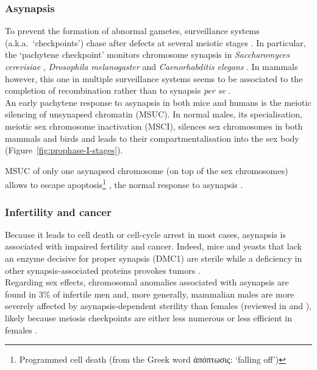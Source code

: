 \subsubsection{Asynapsis}
To prevent the formation of abnormal gametes, surveillance systems (a.k.a.\ ‘checkpoints’) chase after defects at several meiotic stages \citep[reviewed in][]{handel2010genetics}.
In particular, the ‘pachytene checkpoint’ \citep{roeder2000pachytene} monitors chromosome synapsis in \textit{Saccharomyces cerevisiae} \citep{wu2006two}, \textit{Drosophila melanogaster} \citep{ghabrial1999activation,abdu2002activation} and \textit{Caenorhabditis elegans} \citep{bhalla2005conserved}.
In mammals however, this one in multiple surveillance systems \citep{barchi2005surveillance} seems to be associated to the completion of recombination rather than to synapsis \textit{per se} \citep{li2007mouse}.\\

An early pachytene response to asynapsis in both mice \citep{baarends2005silencing,turner2005silencing} and humans \citep{ferguson2008silencing,sciurano2007asynaptic} is the meiotic silencing of unsynapsed chromatin (MSUC). 
In normal males, its specialisation, meiotic sex chromosome inactivation (MSCI), silences sex chromosomes in both mammals and birds \citep{schoenmakers2009female} and leads to their compartmentalisation into the sex body (Figure~\ref{fig:prophase-I-stages}).

MSUC of only one asynapsed chromosome (on top of the sex chromosomes) allows to escape apoptosis\footnote{Programmed cell death (from the Greek word \textgreek{ἀπόπτωσις}: ‘falling off’)} \citep{mahadevaiah2008extensive,jaramillo-lambert2010single}, the normal response to asynapsis \citep{hochwagen2006checking}.


\subsubsection{Infertility and cancer}
Because it leads to cell death or cell-cycle arrest in most cases, asynapsis is associated with impaired fertility and cancer.
Indeed, mice and yeasts that lack an enzyme decisive for proper synapsis (DMC1) are sterile \citep{bannister2007dominant} while a deficiency in other synapsis-associated proteins provokes tumors \citep{moynahan2002cancer, jasin2002homologous}.\\

Regarding sex effects, chromosomal anomalies associated with asynapsis are found in 3\% of infertile men \citep[cited in \citealp{burgoyne2009consequences}]{vincent2002cytogenetic} and, more generally, mammalian males are more severely affected by asynapsis-dependent sterility than females (reviewed in \citealp{burgoyne2009consequences} and \citealp{hunt2002sex}), likely because meiosis checkpoints are either less numerous or less efficient in females \citep{champion2002playing}.

